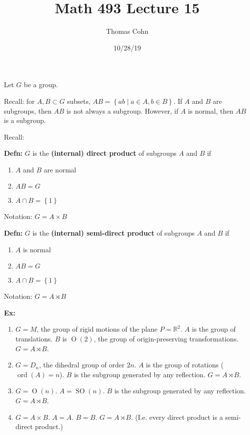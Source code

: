 \documentclass[10pt,letterpaper]{article}
\author{Thomas Cohn}
\title{Math 493 Lecture 15}
\date{10/28/19} %
\newcommand{\n}{\hfill\break}
\newcommand{\up}{\vspace{-\baselineskip}}
\newcommand{\hangblock}[2]{\par\noindent\settowidth{\hangindent}{\textbf{#1: }}\textbf{#1: }\!\!\!#2}
\newcommand{\defn}[1]{\hangblock{Defn}{#1}}
\newcommand{\ex}[1]{\hangblock{Ex}{#1}}
\newcommand{\set}[1]{\left\{#1\right\}}
\newcommand{\reals}{\mathbb{R}}
\newcommand{\R}{\reals}
\DeclareMathOperator{\ord}{ord}
\DeclareMathOperator{\SO}{SO}
\begin{document}
\maketitle
\setlength\RaggedRightParindent{\parindent}
\RaggedRight

\par\noindent
Let $G$ be a group.\n

\par\noindent
Recall: for $A,B\subset{}G$ subsets, $AB=\set{ab\mid{}a\in{}A,b\in{}B}$. If $A$ and $B$ are subgroups, then $AB$ is not always a subgroup. However, if $A$ is normal, then $AB$ is a subgroup.\n

\par\noindent
Recall:
\defn{
	$G$ is the \textbf{(internal) direct product} of subgroups $A$ and $B$ if
	\begin{enumerate}[leftmargin=4\parindent]
		\item $A$ and $B$ are normal
		\item $AB=G$
		\item $A\cap{}B=\set{1}$
	\end{enumerate}\up\n
	Notation: $G=A\times{}B$\n
}

\defn{
	$G$ is the \textbf{(internal) semi-direct product} of subgroups $A$ and $B$ if
	\begin{enumerate}[leftmargin=4\parindent]
		\item $A$ is normal
		\item $AB=G$
		\item $A\cap{}B=\set{1}$
	\end{enumerate}\up\n
	Notation: $G=A\rtimes{}B$\n
}

\ex{
	\begin{enumerate}[leftmargin=4\parindent]
		\item $G=M$, the group of rigid motions of the plane $P=\R^{2}$.\n
		$A$ is the group of translations.\n
		$B$ is $\operatorname{O}(2)$, the group of origin-preserving transformations.\n
		$G=A\rtimes{}B$.\n
		\item $G=D_{n}$, the dihedral group of order $2n$.\n
		$A$ is the group of rotations ($\ord(A)=n$).\n
		$B$ is the subgroup generated by any reflection.\n
		$G=A\rtimes{}B$.\n
		\item $G=\operatorname{O}(n)$.\n
		$A=\SO(n)$.\n
		$B$ is the subgroup generated by any reflection.\n
		$G=A\rtimes{}B$.\n
		\item $G=A\times{}B$.\n
		$A=A$.\n
		$B=B$.\n
		$G=A\rtimes{}B$. (I.e. every direct product is a semi-direct product.)
	\end{enumerate}
}
\end{document}

